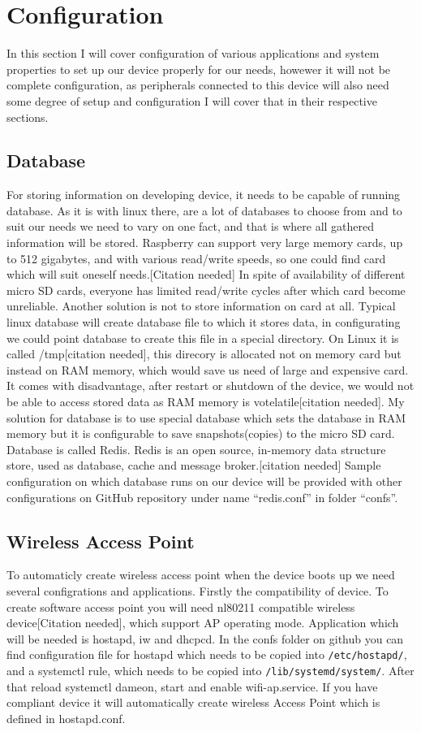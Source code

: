 \section{Configuration} %
\label{sec:configuration}
In this section I will cover configuration of various applications and system properties to set up our device properly for our needs, howewer it will not be complete configuration, as peripherals connected to this device will also need some degree of setup and configuration I will cover that in their respective sections.
\subsection{Database} %
\label{sub:database}
For storing information on developing device, it needs to be capable of running database. As it is with linux there, are a lot of databases to choose from and to suit our needs we need to vary on one fact, and that is where all gathered information will be stored. Raspberry can support very large memory cards, up to 512 gigabytes, and with various read/write speeds, so one could find card which will suit oneself needs.[Citation needed] In spite of availability of different micro SD cards, everyone has limited read/write cycles after which card become unreliable. Another solution is not to store information on card at all. Typical linux database will create database file to which it stores data, in configurating we could point database to create this file in a special directory. On Linux it is called /tmp[citation needed], this direcory is allocated not on memory card but instead on RAM memory, which would save us need of large and expensive card. It comes with disadvantage, after restart or shutdown of the device, we would not be able to access stored data as RAM memory is votelatile[citation needed].
My solution for database is to use special database which sets the database in RAM memory but it is configurable to save snapshots(copies) to the micro SD card. Database is called Redis. Redis is an open source, in-memory data structure store, used as database, cache and message broker.[citation needed] Sample configuration on which database runs on our device will be provided with other configurations on GitHub repository under name ``redis.conf'' in folder ``confs''.
\subsection{Wireless Access Point} %
\label{sub:wireless_access_point}
To automaticly create wireless access point when the device boots up we need several configrations and applications. Firstly the compatibility of device. To create software access point you will need nl80211 compatible wireless device[Citation needed], which support AP operating mode. Application which will be needed is hostapd, iw and dhcpcd. In the confs folder on github you can find configuration file for hostapd which needs to be copied into \verb|/etc/hostapd/|, and a systemctl rule, which needs to be copied into \verb|/lib/systemd/system/|. After that reload systemctl dameon, start and enable wifi-ap.service. If you have compliant device it will automatically create wireless Access Point which is defined in hostapd.conf.
